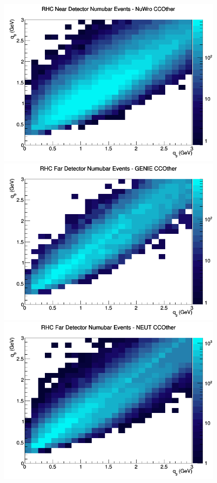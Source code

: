 \begin{figure}[h]
\includegraphics[width=\linewidth]{eff_q0_q3/GAr/CCOther_RHC_ND_numubar_q3_q0_NuWro.png}
\endminipage
\newline
{}
\includegraphics[width=\linewidth]{eff_q0_q3/GAr/CCOther_RHC_FD_numubar_q3_q0_GENIE.png}
\endminipage
{}
\includegraphics[width=\linewidth]{eff_q0_q3/GAr/CCOther_RHC_FD_numubar_q3_q0_NEUT.png}

\end{figure}
